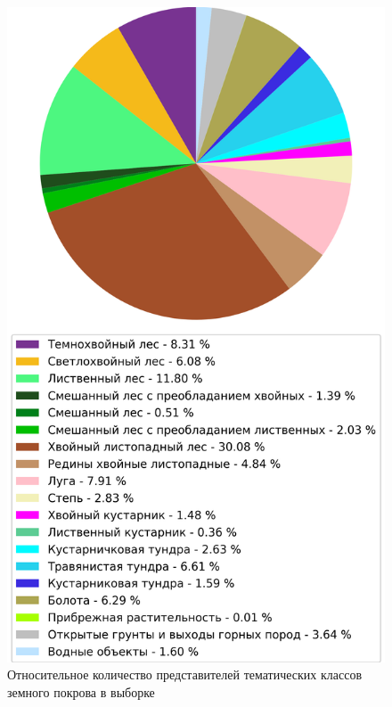 \documentclass[14pt, a4paper, oneside]{extarticle}
\begin{document}
\begin{figure}[H]
    \caption{Относительное количество представителей тематических классов земного покрова в выборке}
    \centering
    \includegraphics[scale=0.9]{classes-ratio}
\end{figure}
\end{document}
